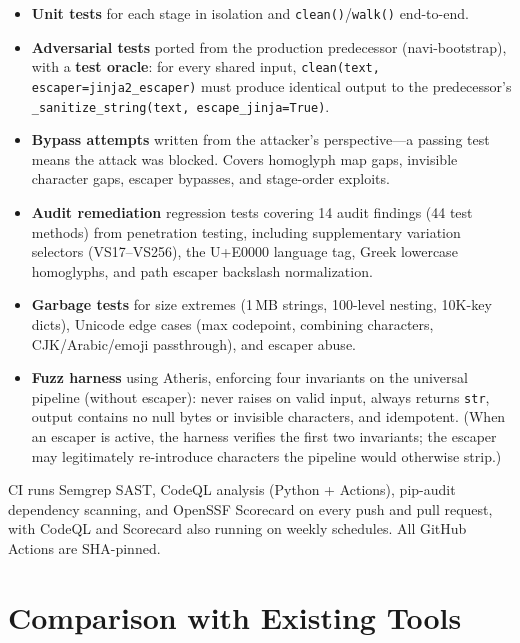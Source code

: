 \documentclass[11pt,letterpaper]{article}
\begin{document}
\begin{itemize}
\item \textbf{Unit tests} for each stage in isolation and \texttt{clean()}/\texttt{walk()} end-to-end.
\item \textbf{Adversarial tests} ported from the production predecessor (navi-bootstrap), with a \textbf{test oracle}: for every shared input, \texttt{clean(text, escaper=jinja2\_escaper)} must produce identical output to the predecessor's \texttt{\_sanitize\_string(text, escape\_jinja=True)}.
\item \textbf{Bypass attempts} written from the attacker's perspective---a passing test means the attack was blocked. Covers homoglyph map gaps, invisible character gaps, escaper bypasses, and stage-order exploits.
\item \textbf{Audit remediation} regression tests covering 14 audit findings (44 test methods) from penetration testing, including supplementary variation selectors (VS17--VS256), the U+E0000 language tag, Greek lowercase homoglyphs, and path escaper backslash normalization.
\item \textbf{Garbage tests} for size extremes (1\,MB strings, 100-level nesting, 10K-key dicts), Unicode edge cases (max codepoint, combining characters, CJK/Arabic/emoji passthrough), and escaper abuse.
\item \textbf{Fuzz harness} using Atheris, enforcing four invariants on the universal pipeline (without escaper): never raises on valid input, always returns \texttt{str}, output contains no null bytes or invisible characters, and idempotent. (When an escaper is active, the harness verifies the first two invariants; the escaper may legitimately re-introduce characters the pipeline would otherwise strip.)
\end{itemize}

CI runs Semgrep SAST, CodeQL analysis (Python + Actions), pip-audit dependency scanning, and OpenSSF Scorecard on every push and pull request, with CodeQL and Scorecard also running on weekly schedules. All GitHub Actions are SHA-pinned.


\section{Comparison with Existing Tools}
\end{document}
